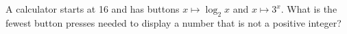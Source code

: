 A calculator starts at 16 and has buttons $x\mapsto\log_2x$ and $x\mapsto3^x$. What is the fewest button presses needed to display a number that is not a positive integer?
